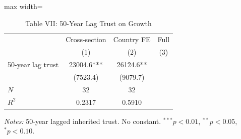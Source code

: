 \begin{table}[htbp]
\centering
\caption{Table VII: 50-Year Lag Trust on Growth}
\label{tab:algan_table7}
\begin{adjustbox}{max width=\textwidth}
\begin{tabular}{lccc}
\toprule
 & Cross-section & Country FE & Full \\
 & (1) & (2) & (3) \\
\midrule
50-year lag trust & 23004.6*** & 26124.6** &  \\
 & (7523.4) & (9079.7) &  \\
\midrule
$N$ & 32 & 32 &  \\
$R^2$ & 0.2317 & 0.5910 &  \\
\bottomrule
\end{tabular}
\end{adjustbox}
\parbox{\textwidth}{\footnotesize\textit{Notes:} 50-year lagged inherited trust. No constant. $^{***}p<0.01$, $^{**}p<0.05$, $^{*}p<0.10$.}
\end{table}